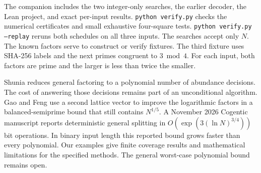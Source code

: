 The companion includes the two integer-only searches, the earlier decoder, the Lean project, and exact per-input results. \texttt{python verify.py} checks the numerical certificates and small exhaustive four-square tests. \texttt{python verify.py --replay} reruns both schedules on all three inputs. The searches accept only $N$. The known factors serve to construct or verify fixtures. The third fixture uses SHA-256 labels and the next primes congruent to $3\bmod4$. For each input, both factors are prime and the larger is less than twice the smaller.

Shunia  reduces general factoring to a polynomial number of abundance decisions. The cost of answering those decisions remains part of an unconditional algorithm. Gao and Feng  use a second lattice vector to improve the logarithmic factors in a balanced-semiprime bound that still contains $N^{1/5}$. A November 2026 Cogentic manuscript  reports deterministic general splitting in $O(\exp(3(\ln N)^{3/4}))$ bit operations. In binary input length this reported bound grows faster than every polynomial. Our examples give finite coverage results and mathematical limitations for the specified methods. The general worst-case polynomial bound remains open.


